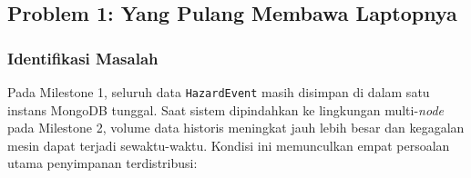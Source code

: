 \subsection{Problem 1: Yang Pulang Membawa Laptopnya}

\subsubsection{Identifikasi Masalah}

Pada Milestone 1, seluruh data \texttt{HazardEvent} masih disimpan di dalam satu instans MongoDB tunggal. Saat sistem dipindahkan ke lingkungan multi-\textit{node} pada Milestone 2, volume data historis meningkat jauh lebih besar dan kegagalan mesin dapat terjadi sewaktu-waktu. Kondisi ini memunculkan empat persoalan utama penyimpanan terdistribusi:

